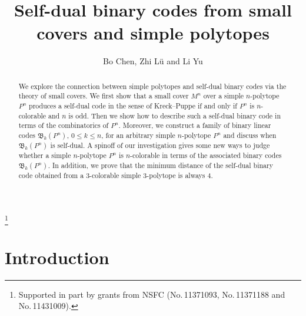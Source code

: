 \documentclass[12pt]{amsart}
\theoremstyle{plain} \numberwithin{equation}{section}
\theoremstyle{definition}
\theoremstyle{remark}
\begin{document}
\title[Self-dual binary codes from small covers and simple polytopes]{\large \bf Self-dual binary codes from small covers and simple polytopes}
\author[Bo Chen, Zhi L\"u and Li Yu]{Bo Chen, Zhi L\"u and Li Yu}
\thanks{Supported in part by grants from NSFC (No.\,11371093, No.\,11371188 and No.\,11431009).}

\address{School of Mathematics and Statistics, Huazhong University of Science and Technology, Wuhan, 430074, P. R.  China}
\address{School of Mathematical Sciences, Fudan University, Shanghai,
200433, P.R. China.} 
\address{Department of Mathematics and IMS, Nanjing University, Nanjing, 210093, P.R.China}

\begin{abstract}
We explore the connection between simple polytopes and self-dual binary codes 
 via the theory of small covers. We first show that a small cover
$M^n$ over a simple $n$-polytope $P^n$ produces a self-dual code in the sense of Kreck--Puppe if and only if $P^n$ is $n$-colorable and $n$ is odd. 
Then we show how to describe such a self-dual binary code in terms of the combinatorics of $P^n$.
 Moreover, we construct a family of
 binary linear codes $\mathfrak{B}_k(P^n)$, $0\leq k\leq n$, for an arbitrary simple 
$n$-polytope $P^n$ and discuss when $\mathfrak{B}_k(P^n)$ is self-dual. 
 A spinoff of our investigation gives some
  new ways to judge whether a simple $n$-polytope 
  $P^n$ is $n$-colorable in terms of 
  the associated binary codes $\mathfrak{B}_k(P^n)$.
  In addition, we prove that the minimum distance of 
  the self-dual binary code obtained from a $3$-colorable simple $3$-polytope
  is always $4$. 

\end{abstract}

\maketitle

\section{Introduction}\label{int}
\end{document}
